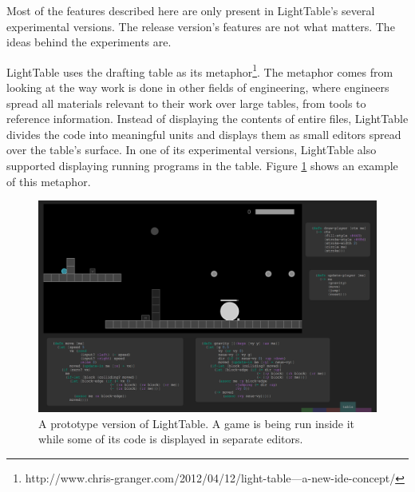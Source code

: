 \documentclass{./llncs2e/llncs}
\begin{document}
	Most of the features described here are only present in LightTable's several experimental versions. 
	The release version's features are not what matters. 
	The ideas behind the experiments are.

	LightTable uses the drafting table as its metaphor\footnote{http://www.chris-granger.com/2012/04/12/light-table---a-new-ide-concept/}. 
	The metaphor comes from looking at the way work is done in other fields of engineering, where engineers spread all materials relevant to their work over large tables, from tools to reference information. 
	Instead of displaying the contents of entire files, LightTable divides the code into meaningful units and displays them as small editors spread over the table's surface. 
	In one of its experimental versions, LightTable also supported displaying running programs in the table. 
	Figure \ref{fig:lt:draft:table} shows an example of this metaphor.


	\begin{figure}
	  \centering
	  \includegraphics[width=1.0\textwidth]{img/lt_game_example}
	    \caption{A prototype version of LightTable. A game is being run inside it while some of its code is displayed in separate editors.}
	  \label{fig:lt:draft:table}
	\end{figure} 
\end{document}
